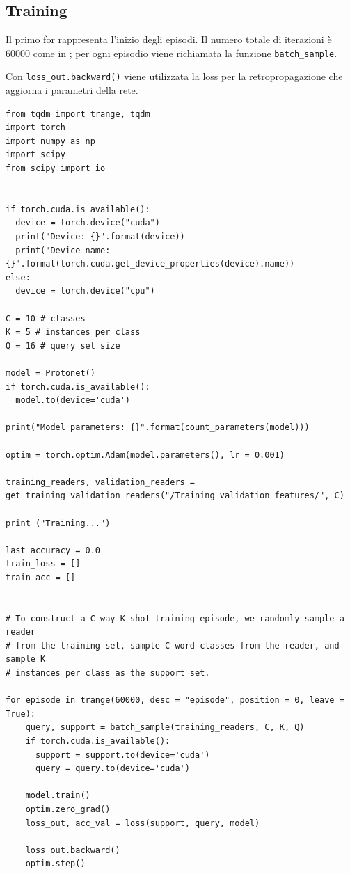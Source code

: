 \documentclass[12pt,a4paper,titlepage]{article}
\begin{document}
\subsection{Training}
Il primo for rappresenta l'inizio degli episodi.
Il numero totale di iterazioni è 60000 come in \cite{salamon:Few-Shot}; per ogni episodio viene richiamata la funzione \texttt{batch\_sample}.

Con \texttt{loss\_out.backward()} viene utilizzata la loss per la retropropagazione che aggiorna i parametri della rete.

\begin{lstlisting}[language=iPython,firstnumber=1, caption=protonet\_training.py, label=protonet_training main,captionpos=b]
from tqdm import trange, tqdm
import torch
import numpy as np
import scipy
from scipy import io


if torch.cuda.is_available():
  device = torch.device("cuda")
  print("Device: {}".format(device))
  print("Device name: {}".format(torch.cuda.get_device_properties(device).name))
else:
  device = torch.device("cpu")

C = 10 # classes
K = 5 # instances per class
Q = 16 # query set size

model = Protonet()
if torch.cuda.is_available():
  model.to(device='cuda')

print("Model parameters: {}".format(count_parameters(model)))

optim = torch.optim.Adam(model.parameters(), lr = 0.001)

training_readers, validation_readers = get_training_validation_readers("/Training_validation_features/", C)

print ("Training...")

last_accuracy = 0.0
train_loss = []
train_acc = []


# To construct a C-way K-shot training episode, we randomly sample a reader 
# from the training set, sample C word classes from the reader, and sample K
# instances per class as the support set.

for episode in trange(60000, desc = "episode", position = 0, leave = True):
    query, support = batch_sample(training_readers, C, K, Q)
    if torch.cuda.is_available():
      support = support.to(device='cuda')
      query = query.to(device='cuda')
    
    model.train()
    optim.zero_grad()
    loss_out, acc_val = loss(support, query, model)

    loss_out.backward()
    optim.step()
    

\end{lstlisting}
\end{document}
